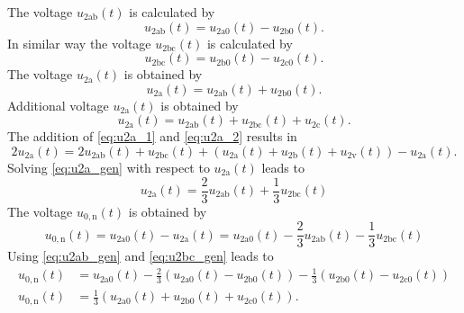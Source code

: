 \begin{solutionblock}
    The voltage $u_{\mathrm{2ab}}(t)$ is calculated by 
    \begin{equation}
        u_{\mathrm{2ab}}(t) =  u_{\mathrm{2a0}}(t) - u_{\mathrm{2b0}}(t).
        \label{eq:u2ab_gen}        
    \end{equation}    
    In similar way the voltage $u_{\mathrm{2bc}}(t)$ is calculated by
    \begin{equation}
        u_{\mathrm{2bc}}(t) =  u_{\mathrm{2b0}}(t) - u_{\mathrm{2c0}}(t).
        \label{eq:u2bc_gen}        
    \end{equation}    
    The voltage $u_{\mathrm{2a}}(t)$ is obtained by
    \begin{equation}
        u_{\mathrm{2a}}(t) =  u_{\mathrm{2ab}}(t) + u_{\mathrm{2b0}}(t).
        \label{eq:u2a_1}        
    \end{equation}    
    Additional voltage $u_{\mathrm{2a}}(t)$ is obtained by
    \begin{equation}
        u_{\mathrm{2a}}(t) =  u_{\mathrm{2ab}}(t) +  u_{\mathrm{2bc}}(t) + u_{\mathrm{2c}}(t).
        \label{eq:u2a_2}        
    \end{equation}    
    The addition of \eqref{eq:u2a_1} and \eqref{eq:u2a_2} results in
    \begin{equation}
        2u_{\mathrm{2a}}(t) =  2u_{\mathrm{2ab}}(t) +  u_{\mathrm{2bc}}(t) 
                               + \left( u_{\mathrm{2a}}(t) + u_{\mathrm{2b}}(t) + u_{\mathrm{2v}}(t)\right)
                               - u_{\mathrm{2a}}(t).
        \label{eq:u2a_gen}        
    \end{equation}    
    Solving \eqref{eq:u2a_gen} with respect to $u_{\mathrm{2a}}(t)$ leads to
    \begin{equation}
        u_{\mathrm{2a}}(t) = \frac{2}{3} u_{\mathrm{2ab}}(t) + \frac{1}{3} u_{\mathrm{2bc}}(t) 
    \end{equation}    
    The voltage $u_{\mathrm{0,n}}(t)$ is obtained by    
    \begin{equation}
        u_{\mathrm{0,n}}(t) = u_{\mathrm{2a0}}(t) - u_{\mathrm{2a}}(t)
        = u_{\mathrm{2a0}}(t) - \frac{2}{3} u_{\mathrm{2ab}}(t) - \frac{1}{3} u_{\mathrm{2bc}}(t)
    \end{equation}
    Using \eqref{eq:u2ab_gen} and \eqref{eq:u2bc_gen} leads to
    \begin{equation}
        \begin{split}
        u_{\mathrm{0,n}}(t) &= u_{\mathrm{2a0}}(t) - \frac{2}{3} \left( u_{\mathrm{2a0}}(t) - u_{\mathrm{2b0}}(t) \right) 
        - \frac{1}{3} \left( u_{\mathrm{2b0}}(t) - u_{\mathrm{2c0}}(t) \right) \\
        u_{\mathrm{0,n}}(t) &= \frac{1}{3} \left( u_{\mathrm{2a0}}(t) + u_{\mathrm{2b0}}(t) + u_{\mathrm{2c0}}(t) \right).
        \end{split}
    \end{equation}
\end{solutionblock}

